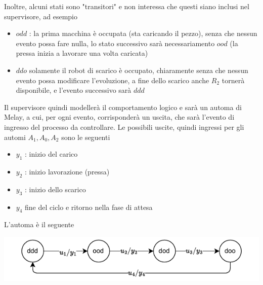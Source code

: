 \documentclass[10pt, letterpaper]{report}
\begin{document}
Inoltre, alcuni stati sono "transitori" e non interessa che questi siano inclusi nel supervisore, ad esempio\begin{itemize}
    \item $odd$ : la prima macchina è occupata (sta caricando il pezzo), senza che nessun evento possa fare nulla, lo stato successivo sarà necessariamento $ood$ (la pressa inizia a lavorare una volta caricata)
    \item $ddo$ solamente il robot di scarico è occupato, chiaramente senza che nessun evento possa modificare l'evoluzione, a fine dello scarico anche $R_2$ tornerà disponibile, e l'evento successivo sarà $ddd$ 
\end{itemize}
Il supervisore quindi modellerà il comportamento logico e sarà un automa di Melay, a cui, per ogni evento, corrisponderà un uscita, che sarà l'evento di ingresso del processo da controllare. Le possibili uscite, quindi ingressi per gli automi $A_1,A_0,A_2$ sono le seguenti \begin{itemize}
    \item $y_1$ : inizio del carico 
    \item $y_2$ : inizio lavorazione (pressa)
    \item $y_3$ : inizio dello scarico 
    \item $y_4$ fine del ciclo e ritorno nella fase di attesa 
\end{itemize}
L'automa è il seguente\begin{center}
    \includegraphics[width=\textwidth]{images/controlloDEDS2.drawio.pdf}
\end{center}
\end{document}
